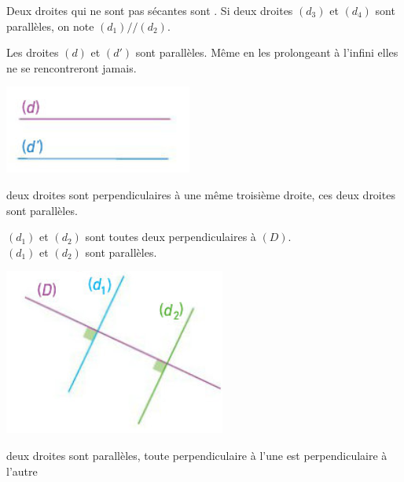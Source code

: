 \begin{mydef}
	Deux droites qui ne sont pas sécantes sont . Si deux droites $(d_3)$ et $(d_4)$ sont parallèles, on note $(d_1) // (d_2)$.
\end{mydef}

\begin{myex}
	\begin{multicols}{2}
		Les droites $(d)$ et $(d')$ sont parallèles. Même en les prolongeant à l'infini elles ne se rencontreront jamais.
		
		\includegraphics[scale=0.6]{img/para1}
	\end{multicols}
	
\end{myex}

\begin{myprop}
	 deux droites sont perpendiculaires à une même troisième droite,  ces deux droites sont parallèles.
\end{myprop}


\begin{myex}
	\begin{multicols}{2}
		 $(d_1)$ et $(d_2)$ sont toutes deux perpendiculaires à $(D)$.\\
		 $(d_1)$ et $(d_2)$ sont parallèles.
		
		\includegraphics[scale=0.6]{img/para2}
	\end{multicols}
	
\end{myex}



\begin{myprop}
	 deux droites sont parallèles,  toute perpendiculaire à l’une est perpendiculaire à l’autre
\end{myprop}


